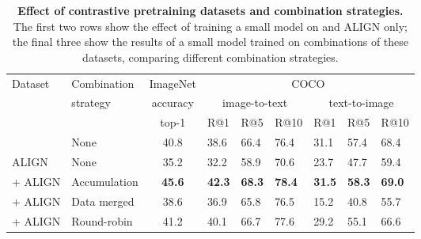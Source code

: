 
\begin{table}[h]
\small
\centering
\begin{tabular}{@{}ll|c|llllll@{}}
\toprule
Dataset    & Combination              &  ImageNet    & \multicolumn{6}{c}{COCO}                                                      \\
        & strategy        & \multicolumn{1}{c|}{accuracy}          & \multicolumn{3}{c}{image-to-text}             & \multicolumn{3}{c}{text-to-image}             \\ 
        &          &   top-1      & R@1           & R@5           & R@10          & R@1           & R@5           & R@10          \\
                        \midrule
\shortimagetextpairs{} &  None  & 40.8       &   38.6         &    66.4       &         76.4  &    31.1       &        57.4   & 68.4  \\ 
ALIGN &  None  & 35.2       &   32.2        &   58.9        &  70.6         & 23.7          &   47.7        & 59.4 \\  
\shortimagetextpairs{} + ALIGN &  Accumulation  & \textbf{45.6}       &     \textbf{42.3}      &     \textbf{68.3}      &     \textbf{78.4}      &    \textbf{31.5}       &    \textbf{58.3}       & \textbf{69.0} \\ 
\shortimagetextpairs{} + ALIGN &  Data merged  & 38.6       &     36.9      & 65.8          &     76.5      &      15.2     &     40.8      & 55.7 \\ 
\shortimagetextpairs{} + ALIGN &  Round-robin  & 41.2       &     40.1     &         66.7  & 77.6          &     29.2      &     55.1      & 66.6  \\ \bottomrule 
\end{tabular}

\vspace{1em}

\caption{\capfontsize{}  \label{tab:contrastive_dataset_ablation} \textbf{Effect of contrastive pretraining datasets and combination strategies.} The first two rows show the effect of training a small model on \shortimagetextpairs{} and ALIGN only; the final three show the results of a small model trained on combinations of these datasets, comparing different combination strategies.
}
\end{table}
